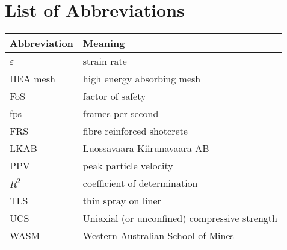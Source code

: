 \chapter{List of Abbreviations}
\vspace{15pt}
\centering
\begin{tabular}{  l l  }
\toprule
Abbreviation & Meaning \\
\midrule

\(\dot{\varepsilon}\) & strain rate \\
HEA mesh & high energy absorbing mesh \\
FoS & factor of safety \\
fps & frames per second \\
FRS & fibre reinforced shotcrete \\
LKAB & Luossavaara Kiirunavaara AB\\
PPV & peak particle velocity \\
\(R^2\) & coefficient of determination \\
TLS & thin spray on liner \\
UCS & Uniaxial (or unconfined) compressive strength \\
WASM & Western Australian School of Mines \\
\bottomrule
\end{tabular}